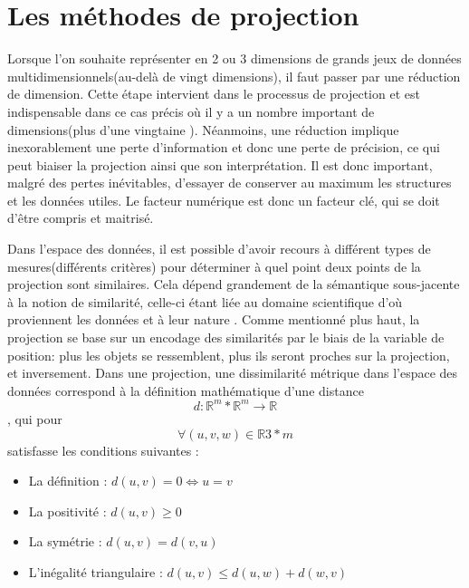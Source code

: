 \section{Les méthodes de projection}

Lorsque l'on souhaite représenter en 2 ou 3 dimensions de grands jeux de données multidimensionnels(au-delà de vingt dimensions\cite{dzemyda2016big}\cite{HeulotThese}), il faut passer par une réduction de dimension. 
Cette étape intervient dans le processus de projection et est indispensable dans ce cas précis où il y a un nombre important de dimensions(plus d'une vingtaine \cite{HeulotThese}). 
Néanmoins, une réduction implique inexorablement une perte d’information et donc une perte de précision, ce qui peut biaiser la projection ainsi que son interprétation. Il est donc important, malgré des pertes inévitables, d'essayer de conserver au maximum les structures et les données utiles.
Le facteur numérique est donc un facteur clé, qui se doit d’être compris et maitrisé. 
\smallskip

Dans l'espace des données, il est possible d’avoir recours à différent types de mesures(différents critères) pour déterminer à quel point deux points de la projection sont similaires. 
Cela dépend grandement de la sémantique sous-jacente à la notion de similarité, celle-ci étant liée au domaine scientifique d’où proviennent les données et à leur nature \cite{HeulotThese}.
Comme mentionné plus haut, la projection se base sur un encodage des similarités par le biais de la variable de position: plus les objets se ressemblent, plus ils seront proches sur la projection, et inversement.
Dans une projection, une dissimilarité métrique dans l’espace des données correspond à la définition mathématique d’une distance \cite{somorjai2011Dissimilarity} \cite{HeulotThese} \newline
 \[d : \mathbb{R}^{m} * \mathbb{R}^{m} \rightarrow \mathbb{R} \] \newline
, qui pour \[\forall (u,v,w) \in \mathbb{R}{3*m}\] satisfasse les conditions suivantes \cite{HeulotThese} : 
\begin{itemize}
    \item La définition : $d(u,v) = 0 \Leftrightarrow u =v$
    \item La positivité : $d(u,v)  \geq 0$
    \item La symétrie : $d(u,v) = d(v,u)$
    \item L'inégalité triangulaire : $d(u,v) \leq d(u,w) + d(w,v)$
\end{itemize}

